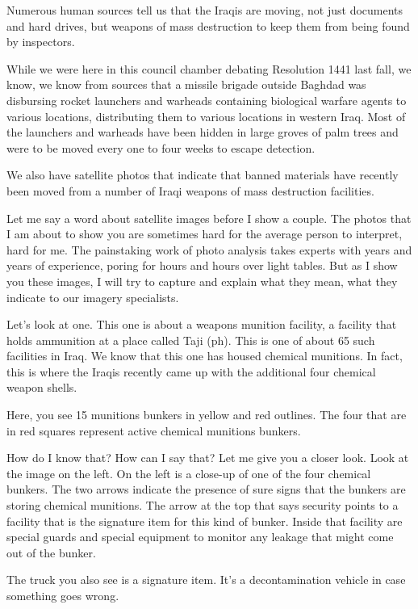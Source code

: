 \documentclass[10pt,a4paper]{article}
\begin{document}
Numerous human sources tell us that the Iraqis are moving, not just documents and hard drives, but weapons of mass destruction to keep them from being found by inspectors.

While we were here in this council chamber debating Resolution 1441 last fall, we know, we know from sources that a missile brigade outside Baghdad was disbursing rocket launchers and warheads containing biological warfare agents to various locations, distributing them to various locations in western Iraq. Most of the launchers and warheads have been hidden in large groves of palm trees and were to be moved every one to four weeks to escape detection.

We also have satellite photos that indicate that banned materials have recently been moved from a number of Iraqi weapons of mass destruction facilities.

Let me say a word about satellite images before I show a couple. The photos that I am about to show you are sometimes hard for the average person to interpret, hard for me. The painstaking work of photo analysis takes experts with years and years of experience, poring for hours and hours over light tables. But as I show you these images, I will try to capture and explain what they mean, what they indicate to our imagery specialists.

Let's look at one. This one is about a weapons munition facility, a facility that holds ammunition at a place called Taji (ph). This is one of about 65 such facilities in Iraq. We know that this one has housed chemical munitions. In fact, this is where the Iraqis recently came up with the additional four chemical weapon shells.

Here, you see 15 munitions bunkers in yellow and red outlines. The four that are in red squares represent active chemical munitions bunkers.

How do I know that? How can I say that? Let me give you a closer look. Look at the image on the left. On the left is a close-up of one of the four chemical bunkers. The two arrows indicate the presence of sure signs that the bunkers are storing chemical munitions. The arrow at the top that says security points to a facility that is the signature item for this kind of bunker. Inside that facility are special guards and special equipment to monitor any leakage that might come out of the bunker.

The truck you also see is a signature item. It's a decontamination vehicle in case something goes wrong.
\end{document}

